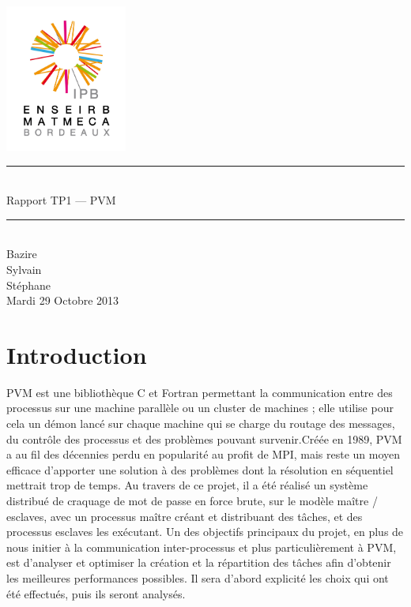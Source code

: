 \documentclass[a4paper,11pt]{article}
\begin{document}
\begin{titlepage}
  \begin{center}

    \begin{center}
      \includegraphics[width=4cm]{EM.jpg}
    \end{center}

    \vspace*{1cm}
        
    \rule{0.75\linewidth}{0.7mm}\\[0.4cm]
    {\Huge Rapport TP1 --- PVM\\[0.4cm]}
    \rule{0.75\linewidth}{0.7mm} \\[1.5cm]

    {\Large Bazire \\Sylvain {}\\Stéphane \\[2cm]}
    {\Large Mardi 29 Octobre 2013}
  \end{center}
\end{titlepage}

\tableofcontents
\clearpage
\section{Introduction}

PVM est une bibliothèque C et Fortran permettant la communication entre des processus sur une machine parallèle ou un cluster de machines ; elle utilise pour cela un démon lancé sur chaque machine qui se charge du routage des messages, du contrôle des processus et des problèmes pouvant survenir.Créée en 1989, PVM a au fil des décennies perdu en popularité au profit de MPI, mais reste un moyen efficace d'apporter une solution à des problèmes dont la résolution en séquentiel mettrait trop de temps. Au travers de ce projet, il a été réalisé un système distribué de craquage de mot de passe en force brute, sur le modèle maître / esclaves, avec un processus maître créant et distribuant des tâches, et des processus esclaves les exécutant. Un des objectifs principaux du projet, en plus de nous initier à la communication inter-processus et plus particulièrement à PVM, est d'analyser et optimiser la création et la répartition des tâches afin d'obtenir les meilleures performances possibles. Il sera d'abord explicité les choix qui ont été effectués, puis ils seront analysés.
\end{document}
